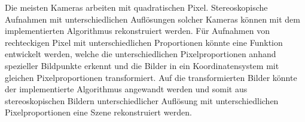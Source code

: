 Die meisten Kameras arbeiten mit quadratischen Pixel. Stereoskopische Aufnahmen mit unterschiedlichen Auflösungen solcher Kameras können mit dem implementierten Algorithmus rekonstruiert werden. Für Aufnahmen von rechteckigen Pixel mit unterschiedlichen Proportionen könnte eine Funktion entwickelt werden, welche die unterschiedlichen Pixelproportionen anhand spezieller Bildpunkte erkennt und die Bilder in ein Koordinatensystem mit gleichen Pixelproportionen transformiert. Auf die transformierten Bilder könnte der implementierte Algorithmus angewandt werden und somit aus stereoskopischen Bildern unterschiedlicher Auflösung mit unterschiedlichen Pixelproportionen eine Szene rekonstruiert werden.  



%
%
%
%
